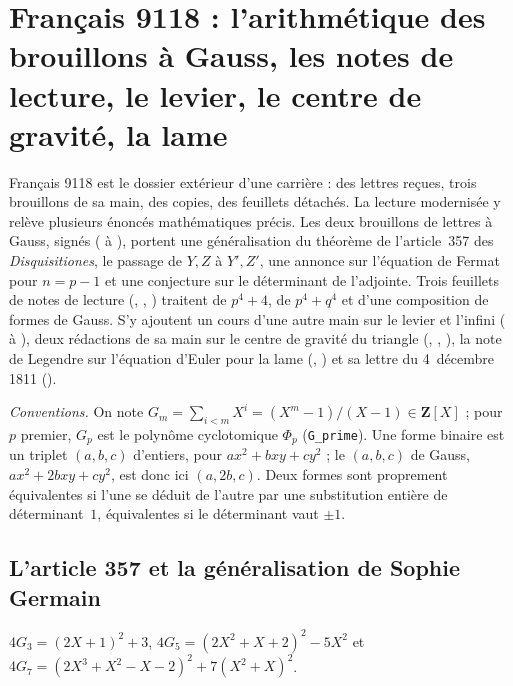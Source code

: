 \section[Français 9118 : l'arithmétique des brouillons à Gauss, les notes de lecture, le levier, le centre de gravité, la lame]{Français 9118 : l'arithmétique des brouillons à Gauss, les notes de lecture, le levier, le centre de gravité, la lame\protect{}}\label{sec:fr-9118}

Français 9118 est le dossier extérieur d'une carrière : des lettres reçues, trois brouillons de sa main, des copies, des feuillets détachés. La lecture modernisée y relève plusieurs énoncés mathématiques précis. Les deux brouillons de lettres à Gauss, signés  ( à ), portent une généralisation du théorème de l'article~357 des \emph{Disquisitiones}, le passage de $Y, Z$ à $Y', Z'$, une annonce sur l'équation de Fermat pour $n = p - 1$ et une conjecture sur le déterminant de l'adjointe. Trois feuillets de notes de lecture (, , ) traitent de $p^4 + 4$, de $p^4 + q^4$ et d'une composition de formes de Gauss. S'y ajoutent un cours d'une autre main sur le levier et l'infini ( à ), deux rédactions de sa main sur le centre de gravité du triangle (, , ), la note de Legendre  sur l'équation d'Euler pour la lame (, ) et sa lettre du 4~décembre 1811 ().

\noindent\emph{Conventions.} On note $G_m = \sum_{i<m} X^i = (X^m - 1)/(X - 1) \in \mathbf Z[X]$ ; pour $p$ premier, $G_p$ est le polynôme cyclotomique $\Phi_p$ (\texttt{G\_prime}). Une forme binaire est un triplet $(a, b, c)$ d'entiers, pour $ax^2 + bxy + cy^2$ ; le $(a, b, c)$ de Gauss, $ax^2 + 2bxy + cy^2$, est donc ici $(a, 2b, c)$. Deux formes sont proprement équivalentes si l'une se déduit de l'autre par une substitution entière de déterminant~$1$, équivalentes si le déterminant vaut $\pm 1$.

\subsection*{L'article 357 et la généralisation de Sophie Germain}

\begin{enonce}[Énoncé de l'édition, d'après la vue 43, l'article 357 pour $p = 3, 5, 7$]
$4G_3 = (2X+1)^2 + 3$, $4G_5 = (2X^2+X+2)^2 - 5X^2$ et $4G_7 = (2X^3+X^2-X-2)^2 + 7(X^2+X)^2$.
\end{enonce}

